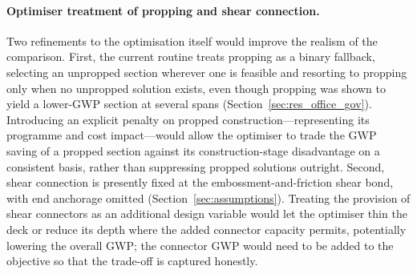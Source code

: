 \paragraph{Optimiser treatment of propping and shear connection.} Two refinements to the optimisation itself would improve the realism of the comparison. First, the current routine treats propping as a binary fallback, selecting an unpropped section wherever one is feasible and resorting to propping only when no unpropped solution exists, even though propping was shown to yield a lower-GWP section at several spans (Section~\ref{sec:res_office_gov}). Introducing an explicit penalty on propped construction---representing its programme and cost impact---would allow the optimiser to trade the GWP saving of a propped section against its construction-stage disadvantage on a consistent basis, rather than suppressing propped solutions outright. Second, shear connection is presently fixed at the embossment-and-friction shear bond, with end anchorage omitted (Section~\ref{sec:assumptions}). Treating the provision of shear connectors as an additional design variable would let the optimiser thin the deck or reduce its depth where the added connector capacity permits, potentially lowering the overall GWP; the connector GWP would need to be added to the objective so that the trade-off is captured honestly.